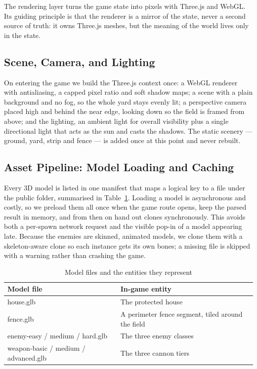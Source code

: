 \documentclass[12pt,a4paper]{report}
\begin{document}
The rendering layer turns the game state into pixels with Three.js and WebGL.
Its guiding principle is that the renderer is a mirror of the state, never a
second source of truth: it owns Three.js meshes, but the meaning of the world
lives only in the state.

\subsection{Scene, Camera, and Lighting}

On entering the game we build the Three.js context once: a WebGL renderer with
antialiasing, a capped pixel ratio and soft shadow maps; a scene with a plain
background and no fog, so the whole yard stays evenly lit; a perspective camera
placed high and behind the near edge, looking down so the field is framed from
above; and the lighting, an ambient light for overall visibility plus a single
directional light that acts as the sun and casts the shadows. The static scenery
--- ground, yard, strip and fence --- is added once at this point and never
rebuilt.

\subsection{Asset Pipeline: Model Loading and Caching}

Every 3D model is listed in one manifest that maps a logical key to a file under
the public folder, summarised in Table~\ref{tab:models}. Loading a model is
asynchronous and costly, so we preload them all once when the game route opens,
keep the parsed result in memory, and from then on hand out clones synchronously.
This avoids both a per-spawn network request and the visible pop-in of a model
appearing late. Because the enemies are skinned, animated models, we clone them
with a skeleton-aware clone so each instance gets its own bones; a missing file
is skipped with a warning rather than crashing the game.

\begin{table}[htbp]
\centering
\caption{Model files and the entities they represent}
\label{tab:models}
\begin{tabular}{|p{5.5cm}|p{6.5cm}|}
\hline
Model file & In-game entity \\
\hline
house.glb & The protected house \\
\hline
fence.glb & A perimeter fence segment, tiled around the field \\
\hline
enemy-easy / medium / hard.glb & The three enemy classes \\
\hline
weapon-basic / medium / advanced.glb & The three cannon tiers \\
\hline
\end{tabular}
\end{table}
\end{document}
